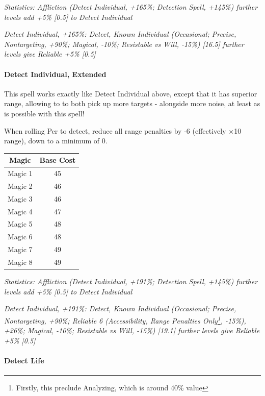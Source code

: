 \begin{multicols*}{3}
	\textcolor{OliveGreen}{\textit{ Statistics: Affliction (Detect Individual, +165\%; Detection Spell, +145\%) further levels add +5\% [0.5] to Detect Individual}}
	
	\textcolor{OliveGreen}{\textit{Detect Individual, +165\%: Detect, Known Individual (Occasional; Precise, Nontargeting, +90\%; Magical, -10\%; Resistable vs Will, -15\%) [16.5] further levels give Reliable +5\% [0.5]}}
	
	\paragraph{Detect Individual, Extended}
	
	This spell works exactly like Detect Individual above, except that it has superior range, allowing to to both pick up more targets - alongside more noise, at least as is possible with this spell!
	
	When rolling Per to detect, reduce all range penalties by -6 (effectively $\times$10 range), down to a minimum of 0.
	
	\begin{center}
		\begin{tabular}{|c|c|}
			\hline
			Magic & Base Cost \\
			\hline
			\hline
			Magic 1 & 45 \\
			Magic 2 & 46 \\
			Magic 3 & 46 \\
			Magic 4 & 47 \\
			Magic 5 & 48 \\
			Magic 6 & 48 \\
			Magic 7 & 49 \\
			Magic 8 & 49 \\
			\hline
		\end{tabular}
	\end{center} 
	
	\textcolor{OliveGreen}{\textit{ Statistics: Affliction (Detect Individual, +191\%; Detection Spell, +145\%) further levels add +5\% [0.5] to Detect Individual}}
	
	\textcolor{OliveGreen}{\textit{Detect Individual, +191\%: Detect, Known Individual (Occasional; Precise, Nontargeting, +90\%; Reliable 6 (Accessibility, Range Penalties Only\footnote{Firstly, this preclude Analyzing, which is around 40\% value}, -15\%), +26\%; Magical, -10\%; Resistable vs Will, -15\%) [19.1] further levels give Reliable +5\% [0.5]}}
	
	\paragraph{Detect Life}
		

\end{multicols*}
